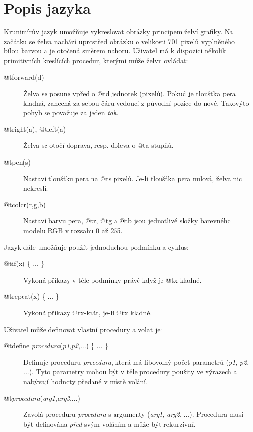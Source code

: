 \section{Popis jazyka}

Krunimírův jazyk umožňuje vykreslovat obrázky principem želví grafiky. Na
začátku se želva nachází uprostřed obrázku o velikosti 701 pixelů
vyplněného bílou barvou a je otočená směrem nahoru. Uživatel má k dispozici
několik primitivních kreslících procedur, kterými může želvu ovládat:

\begin{description}

\item[@t{forward(d)}] Želva se posune vpřed o @t{d} jednotek (pixelů).  Pokud je
  tloušťka pera kladná, zanechá za sebou čáru vedoucí z původní pozice do nové.
  Takovýto pohyb se považuje za jeden \emph{tah}.

\item[@t{right(a)}, @t{left(a)}] Želva se otočí doprava, resp. doleva o @t{a}
  stupňů.

\item[@t{pen(s)}] Nastaví tloušťku pera na @t{s} pixelů. Je-li tloušťka pera
  nulová, želva nic nekreslí.

\item[@t{color(r,g,b)}] Nastaví barvu pera, @t{r}, @t{g} a @t{b} jsou jednotlivé
  složky barevného modelu RGB v rozsahu 0 až 255.

\end{description}

Jazyk dále umožňuje použít jednoduchou podmínku a cyklus:

\begin{description}
\item[@t{if(x) \{ ... \}}] Vykoná příkazy v těle podmínky právě když je
@t{x} kladné.
\item[@t{repeat(x) \{ ... \}}] Vykoná příkazy @t{x}-krát, je-li
@t{x} kladné.
\end{description}

Uživatel může definovat vlastní procedury a volat je:

\begin{description}

\item[@t{define 
  \textsl{procedura}(\textsl{p1},\textsl{p2},...)
  \{ ... \}
}]
  Definuje proceduru \textsl{procedura}, která má libovolný počet parametrů
  (\textsl{p1}, \textsl{p2}, ...). Tyto parametry mohou být v těle procedury
  použity ve výrazech a nabývají hodnoty předané v místě volání.

\item[@t{\textsl{procedura}(\textsl{arg1},\textsl{arg2},...)}]
  Zavolá proceduru \textsl{procedura} s argumenty (\textsl{arg1}, \textsl{arg2},
  ...). Procedura musí být definována \emph{před} svým voláním a může být
  rekurzivní.

\end{description}

